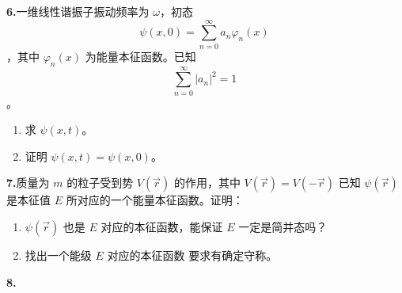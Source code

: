 \textbf{6.}一维线性谐振子振动频率为 $\omega$，初态 $$\psi(x, 0) = \sum_{n=0}^{\infty} a_n \varphi_n(x)~$$，其中 $\varphi_n(x)$ 为能量本征函数。已知 $$\sum_{n=0}^{\infty} |a_n|^2 = 1~$$。
\begin{enumerate}
    \item 求 $\psi(x, t)$。
    \item 证明 $\psi(x, t) = \psi(x, 0) $。
\end{enumerate}

\textbf{7.}质量为 $m$ 的粒子受到势 $V(\vec{r})$ 的作用，其中 $V(\vec{r}) = V(-\vec{r})$ 已知 $\psi(\vec{r})$ 是本征值 $E$ 所对应的一个能量本征函数。证明：
\begin{enumerate}
    \item  $\psi(\vec{r})$ 也是 $E$ 对应的本征函数，能保证 $E$ 一定是简并态吗？
    \item  找出一个能级 $E$ 对应的本征函数 要求有确定守称。
\end{enumerate}

\textbf{8.}